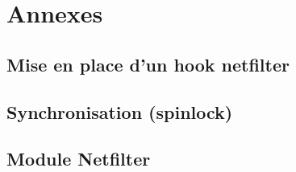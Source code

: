 \documentclass[a4paper]{article}
\begin{document}
\newpage
\appendix

\section{Annexes}
\subsection{Mise en place d'un hook netfilter}
\subsection{Synchronisation (spinlock)}
\subsection{Module Netfilter}
\end{document}
